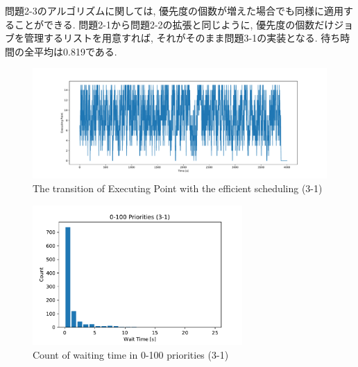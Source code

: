 問題2-3のアルゴリズムに関しては, 優先度の個数が増えた場合でも同様に適用することができる.
問題2-1から問題2-2の拡張と同じように, 優先度の個数だけジョブを管理するリストを用意すれば, それがそのまま問題3-1の実装となる.
待ち時間の全平均は0.819である.

\begin{figure}[htbp]
  \centering
  \includegraphics[width=\linewidth]{imgs/log3_1.pdf}
  \caption{The transition of Executing Point with the efficient scheduling (3-1)}
  \label{fig:log3-1}
\end{figure}


\begin{figure}[htbp]
  \centering
  \includegraphics[width=8cm]{imgs/wait3_1.pdf}
  \caption{Count of waiting time in 0-100 priorities (3-1)}
  \label{fig:wait3-1}
\end{figure}


